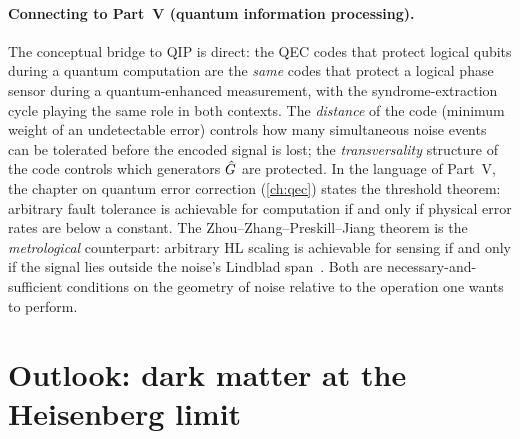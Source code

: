 \paragraph{Connecting to Part~V (quantum information processing).}
The conceptual bridge to QIP is direct: the QEC codes that
protect logical qubits during a quantum computation are the
\emph{same} codes that protect a logical phase sensor during a
quantum-enhanced measurement, with the syndrome-extraction
cycle playing the same role in both contexts. The
\emph{distance} of the code (minimum weight of an undetectable
error) controls how many simultaneous noise events can be
tolerated before the encoded signal is lost; the
\emph{transversality} structure of the code controls which
generators $\hat{G}$ are protected. In the language of Part~V,
the chapter on quantum error correction (\cref{ch:qec}) states the
threshold theorem: arbitrary fault tolerance is achievable for
computation if and only if physical error rates are below a
constant. The Zhou--Zhang--Preskill--Jiang theorem is the
\emph{metrological} counterpart: arbitrary HL scaling is
achievable for sensing if and only if the signal lies outside
the noise's Lindblad span~\cite{zhou2018,layden2019}. Both are
necessary-and-sufficient conditions on the geometry of noise
relative to the operation one wants to perform.

\section{Outlook: dark matter at the Heisenberg limit}
\label{sec:dm-hl-outlook}

